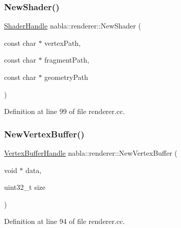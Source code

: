 \mbox{\label{namespacenabla_1_1renderer_a5ff347f33b9171fe24bdc008fb13f395}} 
\subsubsection{\texorpdfstring{NewShader()}{NewShader()}}
{\footnotesize\ttfamily \mbox{\hyperlink{namespacenabla_1_1renderer_a351c881c3df21186064938743d67dd85}{Shader\+Handle}} nabla\+::renderer\+::\+New\+Shader (\begin{DoxyParamCaption}\item[{const char $\ast$}]{vertex\+Path,  }\item[{const char $\ast$}]{fragment\+Path,  }\item[{const char $\ast$}]{geometry\+Path }\end{DoxyParamCaption})}



Definition at line 99 of file renderer.\+cc.

\mbox{\label{namespacenabla_1_1renderer_a57850d0b3aa2dcd479e84c32e1c3572f}} 
\subsubsection{\texorpdfstring{NewVertexBuffer()}{NewVertexBuffer()}}
{\footnotesize\ttfamily \mbox{\hyperlink{namespacenabla_1_1renderer_aa901f31283abb372f2a5ca3b90e09f54}{Vertex\+Buffer\+Handle}} nabla\+::renderer\+::\+New\+Vertex\+Buffer (\begin{DoxyParamCaption}\item[{void $\ast$}]{data,  }\item[{uint32\+\_\+t}]{size }\end{DoxyParamCaption})}



Definition at line 94 of file renderer.\+cc.

\mbox{\label{namespacenabla_1_1renderer_a0fcff1a6f88cc2c4cb542e08602f61d2}} 
